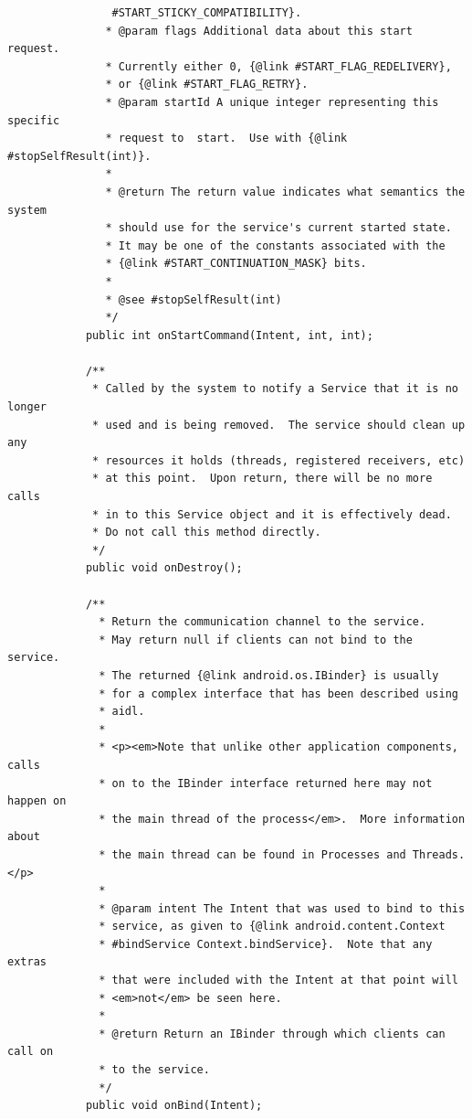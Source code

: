 \begin{lstlisting}
               	#START_STICKY_COMPATIBILITY}.
               * @param flags Additional data about this start request.  
               * Currently either 0, {@link #START_FLAG_REDELIVERY}, 
               * or {@link #START_FLAG_RETRY}.
               * @param startId A unique integer representing this specific 
               * request to  start.  Use with {@link #stopSelfResult(int)}.
               *
               * @return The return value indicates what semantics the system 
               * should use for the service's current started state. 
               * It may be one of the constants associated with the 
               * {@link #START_CONTINUATION_MASK} bits.
               *
               * @see #stopSelfResult(int)
               */
            public int onStartCommand(Intent, int, int);

            /**
             * Called by the system to notify a Service that it is no longer 
             * used and is being removed.  The service should clean up any 
             * resources it holds (threads, registered receivers, etc) 
             * at this point.  Upon return, there will be no more calls
             * in to this Service object and it is effectively dead.  
             * Do not call this method directly.
             */
            public void onDestroy();

            /**
              * Return the communication channel to the service. 
              * May return null if clients can not bind to the service.  
              * The returned {@link android.os.IBinder} is usually 
              * for a complex interface that has been described using
              * aidl.
              *
              * <p><em>Note that unlike other application components, calls 
              * on to the IBinder interface returned here may not happen on 
              * the main thread of the process</em>.  More information about 
              * the main thread can be found in Processes and Threads.</p>
              *
              * @param intent The Intent that was used to bind to this 
              * service, as given to {@link android.content.Context
              * #bindService Context.bindService}.  Note that any extras 
              * that were included with the Intent at that point will 
              * <em>not</em> be seen here.
              *
              * @return Return an IBinder through which clients can call on 
              * to the service.
              */
            public void onBind(Intent);


\end{lstlisting}

